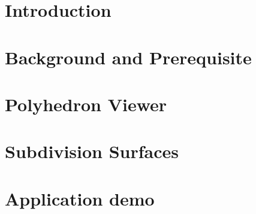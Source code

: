 \documentclass[letter,twoside,10pt]{article}
\begin{document}
\section*{Introduction}


\section*{Background and Prerequisite}
 

\section*{Polyhedron Viewer}


\section*{Subdivision Surfaces}


\section*{Application demo}




\end{document}
